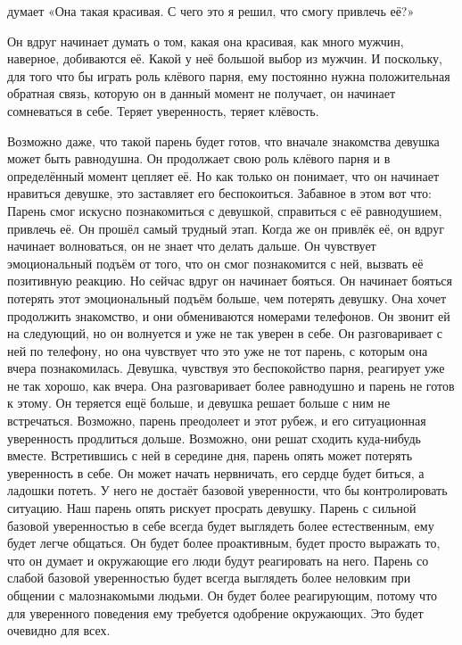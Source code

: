 думает «Она такая красивая. С чего это я решил, что смогу привлечь её?»

Он вдруг начинает думать о том, какая она красивая, как много мужчин, наверное, добиваются её. Какой у неё большой выбор из мужчин. И поскольку, для того что бы играть роль клёвого парня, ему постоянно нужна положительная обратная связь, которую он в данный момент не получает, он начинает сомневаться в себе. Теряет уверенность, теряет клёвость.

Возможно даже, что такой парень будет готов, что вначале знакомства девушка может быть равнодушна. Он продолжает свою роль клёвого парня и в определённый момент цепляет её. Но как только он понимает, что он начинает нравиться девушке, это заставляет его беспокоиться. Забавное в этом вот что: Парень смог искусно познакомиться с девушкой, справиться с её равнодушием, привлечь её. Он прошёл самый трудный этап. Когда же он привлёк её, он вдруг начинает волноваться, он не знает что делать дальше. Он чувствует эмоциональный подъём от того, что он смог познакомится с ней, вызвать её позитивную реакцию. Но сейчас вдруг он начинает бояться. Он начинает бояться потерять этот эмоциональный подъём больше, чем потерять девушку. Она хочет продолжить знакомство, и они обмениваются номерами телефонов. Он звонит ей на следующий, но он волнуется и уже не так уверен в себе. Он разговаривает с ней по телефону, но она чувствует что это уже не тот парень, с которым она вчера познакомилась. Девушка, чувствуя это беспокойство парня, реагирует уже не так хорошо, как вчера. Она разговаривает более равнодушно и парень не готов к этому. Он теряется ещё больше, и девушка решает больше с ним не встречаться. Возможно, парень преодолеет и этот рубеж, и его ситуационная уверенность продлиться дольше. Возможно, они решат сходить куда-нибудь вместе. Встретившись с ней в середине дня, парень опять может потерять уверенность в себе. Он может начать нервничать, его сердце будет биться, а ладошки потеть. У него не достаёт базовой уверенности, что бы контролировать ситуацию. Наш парень опять рискует просрать девушку. Парень с сильной базовой уверенностью в себе всегда будет выглядеть более естественным, ему будет легче общаться. Он будет более проактивным, будет просто выражать то, что он думает и окружающие его люди будут реагировать на него. Парень со слабой базовой уверенностью будет всегда выглядеть более неловким при общении с малознакомыми людьми. Он будет более реагирующим, потому что для уверенного поведения ему требуется одобрение окружающих. Это будет очевидно для всех.


